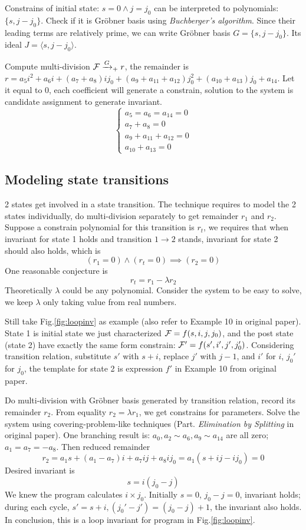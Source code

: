 \documentclass[conference,10pt]{IEEEtran}
\begin{document}
Constrains of initial state: $s=0\land j=j_0$ can be interpreted to polynomials:
$\{s, j-j_0\}$. Check if it is Gr\"obner basis using \emph{Buchberger's algorithm}. Since
their leading terms are relatively prime, we can write Gr\"obner basis $G=\{s, j-j_0\}$. Its ideal
$J=\langle s,j-j_0\rangle$.

Compute multi-division ${\mathcal{F}} \xrightarrow{G}_+ r$, the remainder is
$r = a_5i^2+a_6i+(a_7+a_8)ij_0+(a_9+a_{11}+a_{12})j_0^2+(a_{10}+a_{13})j_0+a_{14}$.
Let it equal to 0, each coefficient will generate a constrain, solution to the system is candidate
assignment to generate invariant.
\begin{equation}
\left\{
\begin{array}{l}
a_5=a_6=a_{14}=0\\
a_7+a_8=0\\
a_9+a_{11}+a_{12}=0\\
a_{10}+a_{13}=0
\end{array}\right.
\nonumber
\end{equation}

\subsection{Modeling state transitions}
2 states get involved in a state transition. The technique requires to model the 2 states individually,
do multi-division separately to get remainder $r_1$ and $r_2$. Suppose a constrain polynomial for
this transition is $r_t$, we requires that when invariant for state 1 holds and transition $1\to 2$ stands,
invariant for state 2 should also holds, which is
$$(r_1 = 0)\land (r_t = 0) \implies (r_2 = 0)$$
One reasonable conjecture is
$$r_t = r_1 - \lambda r_2$$
Theoretically $\lambda$ could be any polynomial. Consider the system to be easy to solve, we keep $\lambda$
only taking value from real numbers.

Still take Fig.\ref{fig:loopinv} as example (also refer to Example 10 in original paper). State 1 is initial state we 
just characterized ${\mathcal{F}} = f(s,i,j,j_0)$, and the post state (state 2) have exactly the same form constrain:
${\mathcal{F}}' = f(s',i',j',j_0')$. Considering transition relation, substitute $s'$ with $s+i$, replace $j'$
with $j-1$, and $i'$ for $i$, $j_0'$ for $j_0$, the template for state 2 is expression $f'$ in Example 10 from
original paper.

Do multi-division with Gr\"obner basis generated by transition relation, record its remainder $r_2$.
From equality $r_2 = \lambda r_1$, we get constrains for parameters. Solve the system using covering-problem-like
techniques (Part. \emph{Elimination by Splitting} in original paper). One branching result is:
$a_0,a_2\sim a_6, a_9\sim a_{14}$ are all zero; $a_1=a_7=-a_8$. Then reduced remainder 
$$r_2 = a_1s +(a_1-a_7)i+a_7ij+a_8ij_0 = a_1(s+ij-ij_0) = 0$$
Desired invariant is 
$$s = i(j_0- j)$$
We knew the program calculates $i\times j_0$. Initially $s=0$, $j_0-j=0$, invariant holds;
during each cycle, $s'=s+i, (j_0'-j') = (j_0-j)+1$, the invariant also holds. In conclusion, this is a
loop invariant for program in Fig.\ref{fig:loopinv}.
\end{document}
